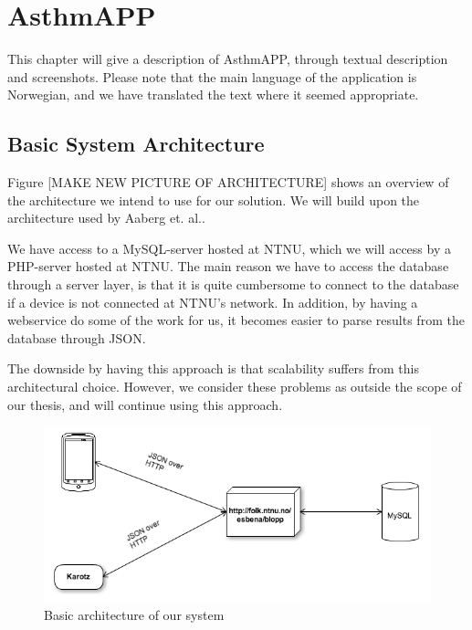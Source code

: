 \chapter{AsthmAPP}
\label{chp:description}

This chapter will give a description of AsthmAPP, through textual description and screenshots. Please note that the main language of the application is Norwegian, and we have translated the text where it seemed appropriate. 

\section{Basic System Architecture}
\label{sec:architecture}
Figure [MAKE NEW PICTURE OF ARCHITECTURE] shows an overview of the architecture we intend to use for our solution. We will build upon the architecture used by Aaberg et. al.\cite{CustomerDriven}.

We have access to a MySQL-server hosted at NTNU, which we will access by a PHP-server hosted at NTNU. The main reason we have to access the database through a server layer, is that it is quite cumbersome to connect to the database if a device is not connected at NTNU's network. In addition, by having a webservice do some of the work for us, it becomes easier to parse results from the database through JSON.   


The downside by having this approach is that scalability suffers from this architectural choice. However, we consider these problems as outside the scope of our thesis, and will continue using this approach.

\begin{figure}
		\centering
			\includegraphics[width=0.50\paperwidth]{Pictures/basic-architecture.png}
		\caption{Basic architecture of our system}
		\label{fig:basic-architecture}
\end{figure}

